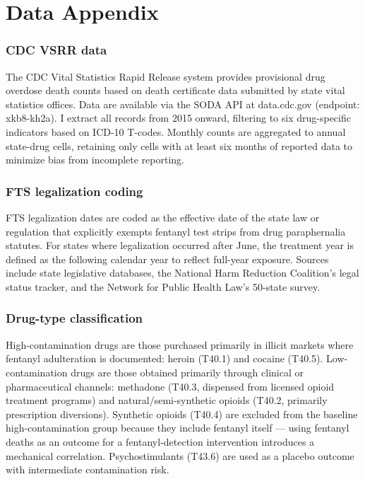\documentclass[12pt]{article}
\begin{document}
\label{apep_main_text_end}
\newpage


\newpage
\appendix

\section{Data Appendix}

\subsubsection*{CDC VSRR data}
The CDC Vital Statistics Rapid Release system provides provisional drug overdose death counts based on death certificate data submitted by state vital statistics offices. Data are available via the SODA API at data.cdc.gov (endpoint: xkb8-kh2a). I extract all records from 2015 onward, filtering to six drug-specific indicators based on ICD-10 T-codes. Monthly counts are aggregated to annual state-drug cells, retaining only cells with at least six months of reported data to minimize bias from incomplete reporting.

\subsubsection*{FTS legalization coding}
FTS legalization dates are coded as the effective date of the state law or regulation that explicitly exempts fentanyl test strips from drug paraphernalia statutes. For states where legalization occurred after June, the treatment year is defined as the following calendar year to reflect full-year exposure. Sources include state legislative databases, the National Harm Reduction Coalition's legal status tracker, and the Network for Public Health Law's 50-state survey.

\subsubsection*{Drug-type classification}
High-contamination drugs are those purchased primarily in illicit markets where fentanyl adulteration is documented: heroin (T40.1) and cocaine (T40.5). Low-contamination drugs are those obtained primarily through clinical or pharmaceutical channels: methadone (T40.3, dispensed from licensed opioid treatment programs) and natural/semi-synthetic opioids (T40.2, primarily prescription diversions). Synthetic opioids (T40.4) are excluded from the baseline high-contamination group because they include fentanyl itself --- using fentanyl deaths as an outcome for a fentanyl-detection intervention introduces a mechanical correlation. Psychostimulants (T43.6) are used as a placebo outcome with intermediate contamination risk.
\end{document}
